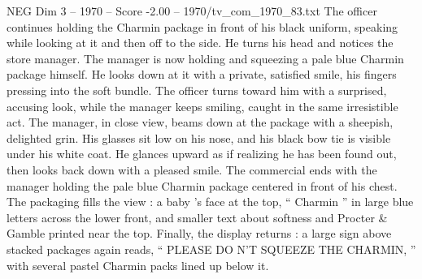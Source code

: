 \begin{textsample}{NEG Dim 3 – 1970 – Score -2.00 – 1970/tv\_com\_1970\_83.txt}
The officer continues holding the Charmin package in front of his black uniform, speaking while looking at it and then off to the side.
He turns his head and notices the store manager.
The manager is now holding and squeezing a pale blue Charmin package himself.
He looks down at it with a private, satisfied smile, his fingers pressing into the soft bundle.
The officer turns toward him with a surprised, accusing look, while the manager keeps smiling, caught in the same irresistible act.
The manager, in close view, beams down at the package with a sheepish, delighted grin.
His glasses sit low on his nose, and his black bow tie is visible under his white coat.
He glances upward as if realizing he has been found out, then looks back down with a pleased smile.
The commercial ends with the manager holding the pale blue Charmin package centered in front of his chest.
The packaging fills the view : a baby ’s face at the top, “ Charmin ” in large blue letters across the lower front, and smaller text about softness and Procter \& Gamble printed near the top.
Finally, the display returns : a large sign above stacked packages again reads, “ PLEASE DO N’T SQUEEZE THE CHARMIN, ” with several pastel Charmin packs lined up below it.

\end{textsample}

